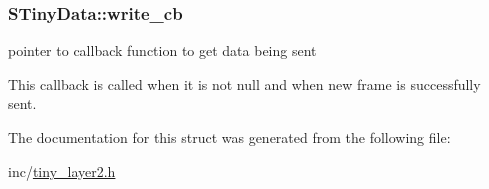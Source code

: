 \subsubsection[{write\+\_\+cb}]{ S\+Tiny\+Data\+::write\+\_\+cb}\label{structSTinyData_ada334c88e86bfd2c10191f65818c3fb3}


pointer to callback function to get data being sent 

This callback is called when it is not null and when new frame is successfully sent. 

The documentation for this struct was generated from the following file\+:\begin{DoxyCompactItemize}
\item 
inc/\hyperlink{tiny__layer2_8h}{tiny\+\_\+layer2.\+h}\end{DoxyCompactItemize}
